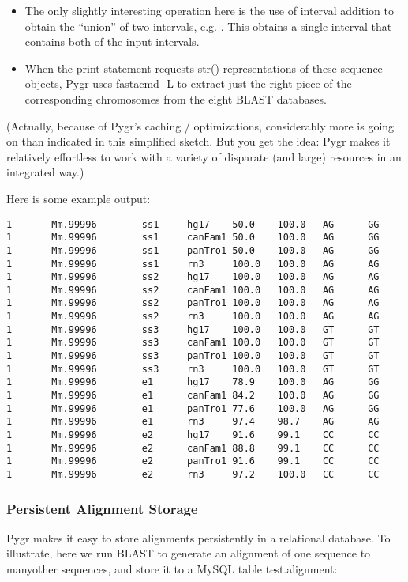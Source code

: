 \documentclass{howto}
\begin{document}
\begin{itemize}
\item
The only slightly interesting operation here is the use of interval
addition to obtain the ``union'' of two intervals, e.g. .
This obtains a single interval that contains both of the input intervals.

\item
When the print  statement requests str() representations of these sequence objects, Pygr uses fastacmd -L to extract just the right piece of the corresponding chromosomes from the eight BLAST databases.

\end{itemize}

(Actually, because of Pygr's caching / optimizations, considerably more is going on than indicated in this simplified sketch.  But you get the idea: Pygr makes it relatively effortless to work with a variety of disparate (and large) resources in an integrated way.)

Here is some example output:
\begin{verbatim}
1       Mm.99996        ss1     hg17    50.0    100.0   AG      GG
1       Mm.99996        ss1     canFam1 50.0    100.0   AG      GG
1       Mm.99996        ss1     panTro1 50.0    100.0   AG      GG
1       Mm.99996        ss1     rn3     100.0   100.0   AG      AG
1       Mm.99996        ss2     hg17    100.0   100.0   AG      AG
1       Mm.99996        ss2     canFam1 100.0   100.0   AG      AG
1       Mm.99996        ss2     panTro1 100.0   100.0   AG      AG
1       Mm.99996        ss2     rn3     100.0   100.0   AG      AG
1       Mm.99996        ss3     hg17    100.0   100.0   GT      GT
1       Mm.99996        ss3     canFam1 100.0   100.0   GT      GT
1       Mm.99996        ss3     panTro1 100.0   100.0   GT      GT
1       Mm.99996        ss3     rn3     100.0   100.0   GT      GT
1       Mm.99996        e1      hg17    78.9    100.0   AG      GG
1       Mm.99996        e1      canFam1 84.2    100.0   AG      GG
1       Mm.99996        e1      panTro1 77.6    100.0   AG      GG
1       Mm.99996        e1      rn3     97.4    98.7    AG      AG
1       Mm.99996        e2      hg17    91.6    99.1    CC      CC
1       Mm.99996        e2      canFam1 88.8    99.1    CC      CC
1       Mm.99996        e2      panTro1 91.6    99.1    CC      CC
1       Mm.99996        e2      rn3     97.2    100.0   CC      CC
\end{verbatim}

	
\subsubsection{Persistent Alignment Storage}
Pygr makes it easy to store alignments persistently in a relational database.  To illustrate, here we run BLAST to generate an alignment of one sequence to manyother sequences, and store it to a MySQL table test.alignment:
\end{document}

